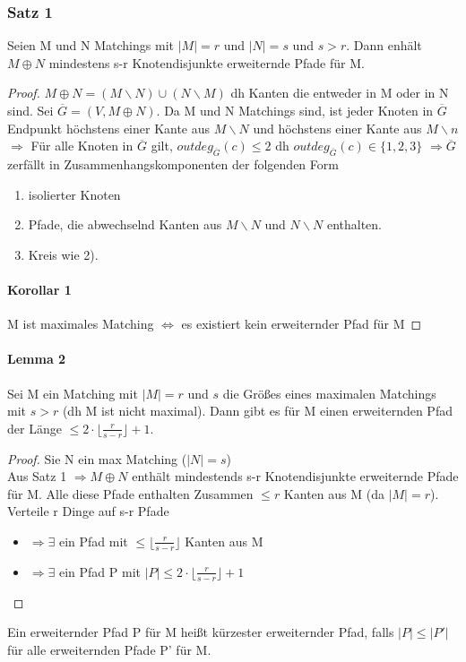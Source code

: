 \subsubsection{Satz 1} Seien M und N Matchings mit $ |M| = r $ und $ |N| = s $ und $  s > r $. Dann enhält $ M \oplus N  $ mindestens s-r Knotendisjunkte erweiternde Pfade für M.

\begin{proof}

$ M \oplus N = (M\backslash N ) \cup (N \backslash M) $ dh Kanten die entweder in M oder in N sind. Sei $ \overline{G} = (V, M \oplus N) $. Da M und N Matchings sind, ist jeder Knoten in $ \overline{G}$ Endpunkt höchstens einer Kante aus $ M \backslash N $ und höchstens einer Kante aus $ M \backslash n $ $ \Rightarrow $ Für alle Knoten in $ \overline{G} $ gilt, $ outdeg_{\overline{G}}(c) \leq 2 $ dh $ outdeg_{\overline{G}}(c) \in \{1, 2, 3\} $ $ \Rightarrow  \overline{G}$ zerfällt in Zusammenhangskomponenten der folgenden Form
\begin{enumerate}
    \item isolierter Knoten
    \item Pfade, die abwechselnd Kanten aus $ M \backslash N $ und $ N \backslash N  $ enthalten.
    \item Kreis wie 2). 
\end{enumerate} 
\paragraph{Korollar 1} M ist maximales Matching $ \Leftrightarrow $ es existiert kein erweiternder Pfad für M
\end{proof}

\paragraph{Lemma 2} Sei M ein Matching mit $ |M| = r $ und $ s $ die Größes eines maximalen Matchings mit $ s>r $ (dh M ist nicht maximal). Dann gibt es für M einen erweiternden Pfad der Länge $ \leq 2 \cdot \lfloor \frac{r}{s-r} \rfloor + 1$.

\begin{proof}
Sie N ein max Matching ($ |N| = s $) \\
Aus Satz 1 $ \Rightarrow M \oplus N$ enthält mindestends s-r Knotendisjunkte erweiternde Pfade für M. Alle diese Pfade enthalten Zusammen $ \leq r $ Kanten aus M (da $ |M| = r $).\\
Verteile r Dinge auf s-r Pfade 

\begin{itemize}
    \item[] $ \Rightarrow \exists$ ein Pfad mit $ \leq \lfloor \frac{r}{s-r} \rfloor$ Kanten aus M 
    \item[] $ \Rightarrow \exists$ ein Pfad P mit  $|P| \leq 2 \cdot \lfloor \frac{r}{s-r} \rfloor + 1$
\end{itemize}
\end{proof}
 Ein erweiternder Pfad P für M heißt kürzester erweiternder Pfad, falls $ |P| \leq |P'| $ für alle erweiternden Pfade P' für M.

